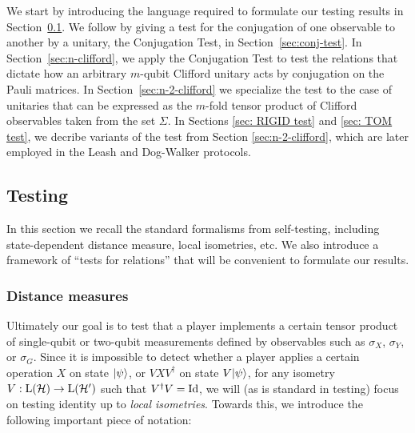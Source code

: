 We start by introducing the language required to formulate our testing results in Section~\ref{sec:general-rigidity}. 
We follow by giving a test for the conjugation of one observable to another by a unitary, the Conjugation Test, in Section~\ref{sec:conj-test}.
In Section~\ref{sec:n-clifford}, we apply the Conjugation Test  to test the
relations that dictate how an arbitrary $m$-qubit Clifford unitary acts by
conjugation on the Pauli matrices. In Section~\ref{sec:n-2-clifford} we
specialize the test to the case of unitaries that can be expressed as the
$m$-fold tensor product of Clifford observables taken from the set $\Sigma$. In
Sections \ref{sec: RIGID test} and \ref{sec: TOM test}, we decribe variants of
the test from Section \ref{sec:n-2-clifford}, which are later employed in the
Leash and Dog-Walker protocols.


\subsection{Testing}
\label{sec:general-rigidity}

In this section we recall the standard formalisms from self-testing, including state-dependent distance measure, local isometries, etc. We also introduce a framework of ``tests for relations'' that will be convenient to formulate our results. 


\subsubsection{Distance measures}

Ultimately our goal is to test that a player implements a certain tensor product of single-qubit or two-qubit measurements defined by observables such as $\sigma_X$, $\sigma_Y$, or $\sigma_G$. Since it is impossible to detect whether a player applies a certain operation $X$ on state $|\psi\rangle$, or $VXV^\dagger$ on state $V|\psi\rangle$, for any isometry $V:\mathrm{L}(\mathcal{H})\to\mathrm{L}(\mathcal{H}')$ such that $V^\dagger V = \mathop{\rm Id}\nolimits$, we will (as is standard in testing) focus on testing identity up to \emph{local isometries}. Towards this, we introduce the following important piece of notation: 

